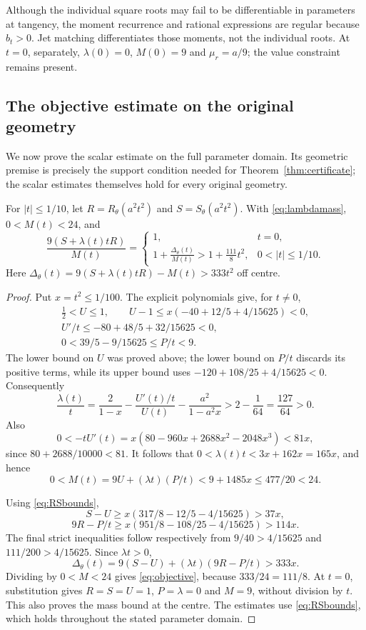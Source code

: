 \documentclass[11pt,a4paper]{article}
\begin{document}
Although the individual square roots may fail to be differentiable in
parameters at tangency, the moment recurrence and rational expressions
are regular because $b_t>0$. Jet matching differentiates those moments,
not the individual roots. At $t=0$, separately, $\lambda(0)=0$,
$M(0)=9$ and $\mu_r=a/9$; the value constraint remains present.

\subsection{The objective estimate on the original geometry}\label{sec:objective}

We now prove the scalar estimate on the full parameter domain.
Its geometric premise is precisely
the support condition needed for Theorem~\ref{thm:certificate}; the
scalar estimates themselves hold for every original geometry.

\begin{lemma}\label{lem:objective}
For $|t|\le1/10$, let $R=R_\theta(a^2t^2)$ and
$S=S_\theta(a^2t^2)$. With \eqref{eq:lambdamass}, $0<M(t)<24$,
and
\begin{equation}\label{eq:objective}
 \frac{9(S+\lambda(t)tR)}{M(t)}=
 \begin{cases}
  1,&t=0,\\
  \displaystyle 1+\frac{\Delta_\theta(t)}{M(t)}
        >1+\frac{111}{8}t^2,&0<|t|\le1/10.
 \end{cases}
\end{equation}
Here $\Delta_\theta(t)=9(S+\lambda(t)tR)-M(t)>333t^2$
off centre.
\end{lemma}
\begin{proof}
Put $x=t^2\le1/100$. The explicit polynomials give, for $t\ne0$,
\[
 \begin{gathered}
 \tfrac12<U\le1,\qquad
 U-1\le x(-40+12/5+4/15625)<0,\\
 U'/t\le-80+48/5+32/15625<0,\\
 0<39/5-9/15625\le P/t<9.
 \end{gathered}
\]
The lower bound on $U$ was proved above; the lower bound on $P/t$
discards its positive terms, while its upper bound uses
$-120+108/25+4/15625<0$. Consequently
\[
 \frac{\lambda(t)}t=
 \frac2{1-x}-\frac{U'(t)/t}{U(t)}-
                \frac{a^2}{1-a^2x}>2-\frac1{64}=\frac{127}{64}>0.
\]
Also
\[
 0<-tU'(t)=x(80-960x+2688x^2-2048x^3)<81x,
\]
since $80+2688/10000<81$. It follows that
$0<\lambda(t)t<3x+162x=165x$, and hence
\[
 0<M(t)=9U+(\lambda t)(P/t)<9+1485x\le477/20<24.
\]

Using \eqref{eq:RSbounds},
\[
 S-U\ge x(317/8-12/5-4/15625)>37x,
\]
\[
 9R-P/t\ge x(951/8-108/25-4/15625)>114x.
\]
The final strict inequalities follow respectively from
$9/40>4/15625$ and $111/200>4/15625$. Since $\lambda t>0$,
\[
 \Delta_\theta(t)=9(S-U)+(\lambda t)(9R-P/t)>333x.
\]
Dividing by $0<M<24$ gives \eqref{eq:objective}, because
$333/24=111/8$. At $t=0$, substitution gives $R=S=U=1$,
$P=\lambda=0$ and $M=9$, without division by $t$. This also
proves the mass bound at the centre. The estimates use
\eqref{eq:RSbounds}, which holds throughout the stated parameter domain.
\end{proof}
\end{document}
